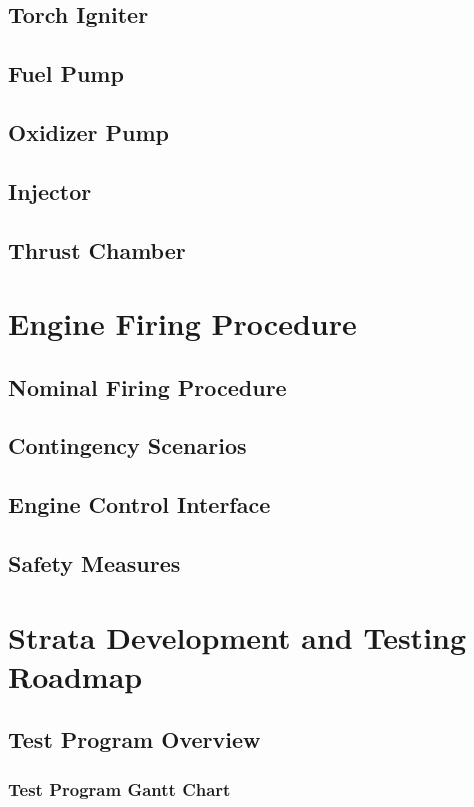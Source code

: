 \documentclass[12pt, letterpaper]{article}
\begin{document}
\subsection{Torch Igniter}
\subsection{Fuel Pump}
\subsection{Oxidizer Pump}
\subsection{Injector}
\subsection{Thrust Chamber}

\section{Engine Firing Procedure}
\subsection{Nominal Firing Procedure}
\subsection{Contingency Scenarios}
\subsection{Engine Control Interface}
\subsection{Safety Measures}

\newpage

\section{Strata Development and Testing Roadmap}
\subsection{Test Program Overview}
\subsubsection{Test Program Gantt Chart}
\end{document}
